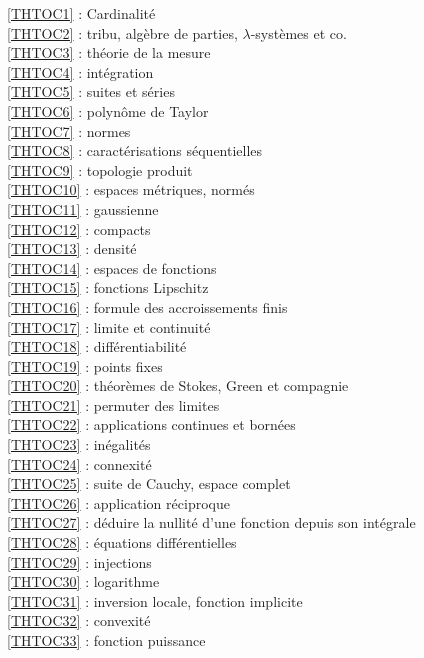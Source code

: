 \ref {THTOC1} : Cardinalité\\
\ref {THTOC2} : tribu, algèbre de parties, \( \lambda \)-systèmes et co.\\
\ref {THTOC3} : théorie de la mesure\\
\ref {THTOC4} : intégration\\
\ref {THTOC5} : suites et séries\\
\ref {THTOC6} : polynôme de Taylor\\
\ref {THTOC7} : normes\\
\ref {THTOC8} : caractérisations séquentielles\\
\ref {THTOC9} : topologie produit\\
\ref {THTOC10} : espaces métriques, normés\\
\ref {THTOC11} : gaussienne\\
\ref {THTOC12} : compacts\\
\ref {THTOC13} : densité\\
\ref {THTOC14} : espaces de fonctions\\
\ref {THTOC15} : fonctions Lipschitz\\
\ref {THTOC16} : formule des accroissements finis\\
\ref {THTOC17} : limite et continuité\\
\ref {THTOC18} : différentiabilité\\
\ref {THTOC19} : points fixes\\
\ref {THTOC20} : théorèmes de Stokes, Green et compagnie\\
\ref {THTOC21} : permuter des limites\\
\ref {THTOC22} : applications continues et bornées\\
\ref {THTOC23} : inégalités\\
\ref {THTOC24} : connexité\\
\ref {THTOC25} : suite de Cauchy, espace complet\\
\ref {THTOC26} : application réciproque\\
\ref {THTOC27} : déduire la nullité d'une fonction depuis son intégrale\\
\ref {THTOC28} : équations différentielles\\
\ref {THTOC29} : injections\\
\ref {THTOC30} : logarithme\\
\ref {THTOC31} : inversion locale, fonction implicite\\
\ref {THTOC32} : convexité\\
\ref {THTOC33} : fonction puissance\\
